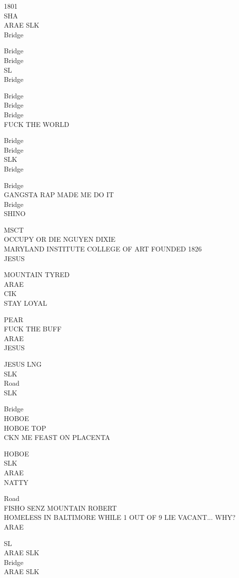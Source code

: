 \documentclass[10pt,letterpaper]{article}
\begin{document}
1801\\
SHA\\
ARAE SLK\\
Bridge

Bridge\\
Bridge\\
SL\\
Bridge

Bridge\\
Bridge\\
Bridge\\
FUCK THE WORLD

Bridge\\
Bridge\\
SLK\\
Bridge

Bridge\\
GANGSTA RAP MADE ME DO IT\\
Bridge\\
SHINO

MSCT\\
OCCUPY OR DIE NGUYEN DIXIE\\
MARYLAND INSTITUTE COLLEGE OF ART FOUNDED 1826\\
JESUS

MOUNTAIN TYRED\\
ARAE\\
CIK\\
STAY LOYAL

PEAR\\
FUCK THE BUFF\\
ARAE\\
JESUS

JESUS LNG\\
SLK\\
Road\\
SLK

Bridge\\
HOBOE\\
HOBOE TOP\\
CKN ME FEAST ON PLACENTA

HOBOE\\
SLK\\
ARAE\\
NATTY

Road\\
FISHO SENZ MOUNTAIN ROBERT\\
HOMELESS IN BALTIMORE WHILE 1 OUT OF 9 LIE VACANT... WHY?\\
ARAE

SL\\
ARAE SLK\\
Bridge\\
ARAE SLK
\end{document}

